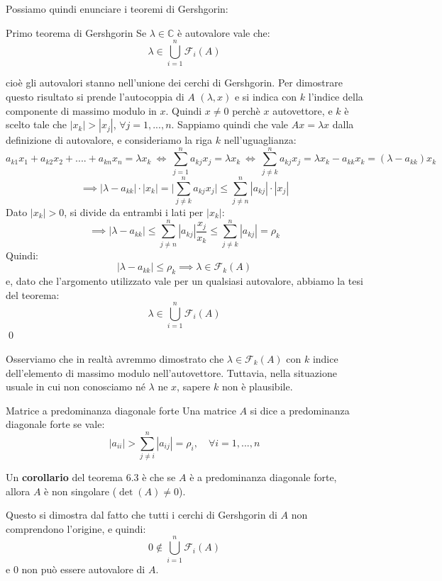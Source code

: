 \documentclass[a4paper,11pt]{article}
\begin{document}
Possiamo quindi enunciare i teoremi di Gershgorin:
\begin{theorem}{Primo teorema di Gershgorin}
	Se $\lambda \in \mathbb{C}$ è autovalore vale che:
	$$
	\lambda \in \bigcup_{i = 1}^n \mathcal{F}_i(A)
	$$
\end{theorem}
cioè gli autovalori stanno nell'unione dei cerchi di Gershgorin.
Per dimostrare questo risultato si prende l'autocoppia di $A$ $(\lambda, x)$ e si indica con $k$ l'indice della componente di massimo modulo in $x$.
Quindi $x \neq 0$ perchè $x$ autovettore, e $k$ è scelto tale che $|x_k| > |x_j|$, $\forall j = 1, ..., n$.
Sappiamo quindi che vale $Ax = \lambda x$ dalla definizione di autovalore, e consideriamo la riga $k$ nell'uguaglianza:
$$
a_{k1} x_1 + a_{k2} x_2 + .... + a_{kn} x_n = \lambda x_k \ \Leftrightarrow \ \sum_{j = 1}^n a_{kj} x_j = \lambda x_k \ \Leftrightarrow \ \sum_{j \neq k}^{n} a_{kj} x_j = \lambda x_k - a_{kk} x_k = (\lambda - a_{kk}) x_k
$$
$$
\implies |\lambda - a_{kk}| \cdot |x_k| = \Big| \sum_{j \neq k}^n a_{kj}x_j \Big| \leq \sum_{j \neq n}^n |a_{kj}| \cdot |x_j|
$$
Dato $|x_k| > 0$, si divide da entrambi i lati per $|x_k|$:
$$
\implies |\lambda - a_{kk}| \leq \sum_{j \neq n}^n |a_{kj}| \frac{x_j}{x_k} \leq \sum_{j \neq k}^n |a_{kj}| = \rho_k
$$
Quindi:
$$
|\lambda - a_{kk}| \leq \rho_k \implies \lambda \in \mathcal{F}_k(A)
$$
e, dato che l'argomento utilizzato vale per un qualsiasi autovalore, abbiamo la tesi del teorema:
$$
\lambda \in \bigcup_{i = 1}^n \mathcal{F}_i(A)
$$ \qed

Osserviamo che in realtà avremmo dimostrato che $\lambda \in \mathcal{F}_k(A)$ con $k$ indice dell'elemento di massimo modulo nell'autovettore.
Tuttavia, nella situazione usuale in cui non conosciamo né $\lambda$ ne $x$, sapere $k$ non è plausibile.

\begin{definition}{Matrice a predominanza diagonale forte}
	Una matrice $A$ si dice a predominanza diagonale forte se vale:
	$$
	|a_{ii}| > \sum_{j \neq i}^n |a_{ij}| = \rho_i, \quad \forall i = 1, ..., n
	$$
\end{definition}

Un \textbf{corollario} del teorema 6.3 è che se $A$ è a predominanza diagonale forte, allora $A$ è non singolare ($\det(A) \neq 0$).

Questo si dimostra dal fatto che tutti i cerchi di Gershgorin di $A$ non comprendono l'origine, e quindi:
$$
0 \not \in \bigcup_{i = 1}^n \mathcal{F}_i (A)
$$
e 0 non può essere autovalore di $A$.
\end{document}
